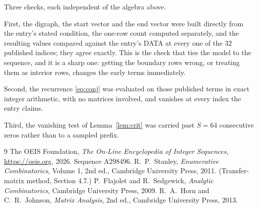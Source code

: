 \documentclass[11pt,a4paper]{article}
\theoremstyle{plain}
\theoremstyle{definition}
\begin{document}
Three checks, each independent of the algebra above.

First, the digraph, the start vector and the end vector were built directly from the
entry's stated condition, the one-row count computed separately, and the resulting values
compared against the entry's DATA at every one of the $32$ published indices; they
agree exactly. This is the check that ties the model to the sequence, and it is a sharp one:
getting the boundary rows wrong, or treating them as interior rows, changes the early terms
immediately.

Second, the recurrence \eqref{eq:conj} was evaluated on those published terms in exact
integer arithmetic, with no matrices involved, and vanishes at every index the entry claims.

Third, the vanishing test of Lemma~\ref{lem:crit} was carried past $S=64$ consecutive
zeros rather than to a sampled prefix.

\begin{thebibliography}{9}
 The OEIS Foundation, \emph{The On-Line Encyclopedia of Integer
Sequences}, \url{https://oeis.org}, 2026. Sequence A298496.
 R.~P.~Stanley, \emph{Enumerative Combinatorics}, Volume 1, 2nd ed.,
Cambridge University Press, 2011. (Transfer-matrix method, Section 4.7.)
 P.~Flajolet and R.~Sedgewick, \emph{Analytic Combinatorics}, Cambridge
University Press, 2009.
 R.~A.~Horn and C.~R.~Johnson, \emph{Matrix Analysis}, 2nd ed., Cambridge
University Press, 2013.
\end{thebibliography}
\end{document}
